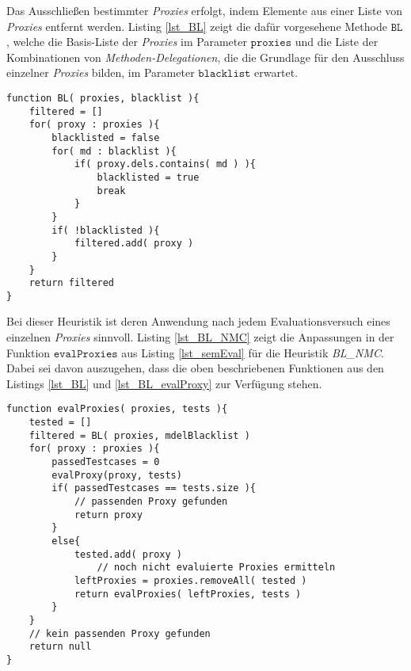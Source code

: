 \noindent
Das Ausschließen bestimmter \emph{Proxies} erfolgt, indem Elemente aus einer Liste von \emph{Proxies} entfernt werden. Listing \ref{lst_BL} zeigt die dafür vorgesehene Methode $\texttt{BL}$, welche die Basis-Liste der \emph{Proxies} im Parameter $\texttt{proxies}$ und die Liste der Kombinationen von \emph{Methoden-Delegationen}, die die Grundlage für den Ausschluss einzelner \emph{Proxies} bilden, im Parameter $\texttt{blacklist}$ erwartet.
\begin{lstlisting}[style = pseudo, label = lst_BL, caption=Blacklist-Methode für Heuristil BL\_NMC, captionpos = b]
function BL( proxies, blacklist ){
	filtered = []	
	for( proxy : proxies ){
		blacklisted = false
		for( md : blacklist ){
			if( proxy.dels.contains( md ) ){
				blacklisted = true
				break
			}	
		}
		if( !blacklisted ){
			filtered.add( proxy )
		}
	}
	return filtered
}

\end{lstlisting}
\noindent
Bei dieser \Gls{Heuristik} ist deren Anwendung nach jedem Evaluationsversuch eines einzelnen \emph{Proxies} sinnvoll. Listing \ref{lst_BL_NMC} zeigt die Anpassungen in der Funktion $\texttt{evalProxies}$ aus Listing \ref{lst_semEval} für die Heuristik \emph{BL\_NMC}. Dabei sei davon auszugehen, dass die oben beschriebenen Funktionen aus den Listings \ref{lst_BL} und \ref{lst_BL_evalProxy} zur Verfügung stehen.
\begin{lstlisting}[style = pseudo, caption=Evaluation mehrere Proxies mit BL\_MNC, captionpos=b, label = lst_BL_NMC]
function evalProxies( proxies, tests ){
	tested = []
	filtered = BL( proxies, mdelBlacklist )
	for( proxy : proxies ){
		passedTestcases = 0
		evalProxy(proxy, tests)
		if( passedTestcases == tests.size ){
			// passenden Proxy gefunden
			return proxy
		}
		else{
			tested.add( proxy )
				// noch nicht evaluierte Proxies ermitteln
			leftProxies = proxies.removeAll( tested )	
			return evalProxies( leftProxies, tests )
		}
	}
	// kein passenden Proxy gefunden
	return null
}
\end{lstlisting}
\noindent